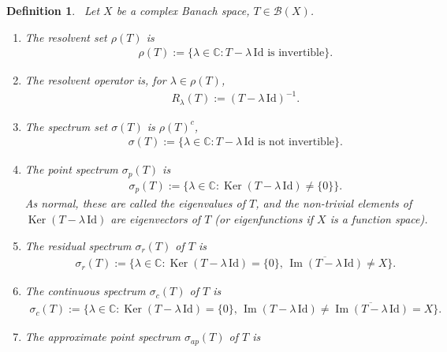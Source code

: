 \documentclass{tikzposter} %
\DeclareMathOperator{\im}{Im}
\DeclareMathOperator{\Ker}{Ker}
\newtheorem{definition}{Definition}
\begin{document}
\begin{columns}
{    \begin{definition}
    \ Let $X$ be a complex Banach space, $T \in \mathcal{B}(X)$.
    \begin{enumerate}[label=\roman*.]
            \item The resolvent set $\rho(T)$ is
            \begin{align*}
              \rho(T) := \{\lambda \in \mathbb{C} : T - \lambda \,\mathrm{Id} \text{ is invertible}\}.
            \end{align*}
            \item The resolvent operator is, for $\lambda \in \rho(T)$,
            \begin{align*}
              R_{\lambda}(T) := (T-\lambda \, \mathrm{Id})^{-1}.
            \end{align*}
            \item The spectrum set $\sigma(T)$ is $\rho(T)^{c}$,
            \begin{align*}
              \sigma(T) := \{\lambda \in \mathbb{C} : T - \lambda \, \mathrm{Id} \text{ is not invertible}\}.
            \end{align*}
            \item The point spectrum $\sigma_{p}(T)$ is
            \begin{align*}
              \sigma_{p}(T) := \{\lambda \in \mathbb{C} : \Ker (T - \lambda \, \mathrm{Id}) \neq \{0\}\}.
            \end{align*}
            As normal, these are called the eigenvalues of $T$, and the non-trivial elements of $\Ker(T-\lambda \, \mathrm{Id})$ are eigenvectors of $T$ (or eigenfunctions if $X$ is a function space).
            \item The residual spectrum $\sigma_{r}(T)$ of $T$ is
            \begin{align*}
              \sigma_{r}(T) := \{\lambda \in \mathbb{C} : \Ker (T - \lambda \, \mathrm{Id}) = \{0\},\,\overline{\im(T - \lambda \,\mathrm{Id})} \neq X\}.
            \end{align*}
            \item The continuous spectrum $\sigma_{c}(T)$ of $T$ is
            \begin{align*}
              \sigma_{c}(T) := \{\lambda \in \mathbb{C} : \Ker (T - \lambda \, \mathrm{Id}) = \{0\},\,\im(T - \lambda \, \mathrm{Id}) \neq \overline{\im(T - \lambda \,\mathrm{Id})} = X\}.
            \end{align*}
            \item The approximate point spectrum $\sigma_{ap}(T)$ of $T$ is

\end{enumerate}
\end{definition}}
\end{columns}
\end{document}
